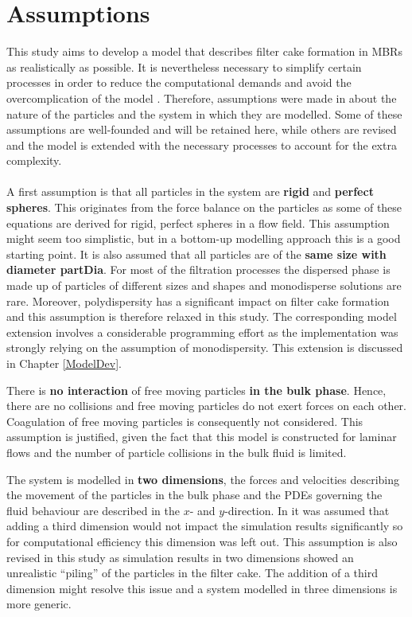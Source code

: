 \section{Assumptions \label{assumptions}}
This study aims to develop a model that describes filter cake formation in \gls{MBR}s as realistically as possible. It is nevertheless necessary to simplify certain processes in order to reduce the computational demands and avoid the overcomplication of the model \citep{bender2000}. Therefore, assumptions were made in \cite{Ghijs2014} about the nature of the particles and the system in which they are modelled. Some of these assumptions are well-founded and will be retained here, while others are revised and the model is extended with the necessary processes to account for the extra complexity. \\ \\
A first assumption is that all particles in the system are \textbf{rigid} and \textbf{perfect spheres}. This originates from the force balance on the particles as some of these equations are derived for rigid, perfect spheres in a flow field. This assumption might seem too simplistic, but in a bottom-up modelling approach this is a good starting point. It is also assumed that all particles are of the \textbf{same size with diameter \gls{partDia}}. For most of the filtration processes the dispersed phase is made up of particles of different sizes and shapes and monodisperse solutions are rare. Moreover, polydispersity has a significant impact on filter cake formation and this assumption is therefore relaxed in this study. The corresponding model extension involves a considerable programming effort as the implementation was strongly relying on the assumption of monodispersity. This extension is discussed in Chapter \ref{ModelDev}. %
\par
There is \textbf{no interaction} of free moving particles \textbf{in the bulk phase}. Hence, there are no collisions and free moving particles do not exert forces on each other. Coagulation of free moving particles is consequently not considered. This assumption is justified, given the fact that this model is constructed for laminar flows and the number of particle collisions in the bulk fluid is limited.\par
The system is modelled in \textbf{two dimensions}, the forces and velocities describing the movement of the particles in the bulk phase and the \glspl{PDE} governing the fluid behaviour are described in the $x$- and $y$-direction. In \cite{Ghijs2014} it was assumed that adding a third dimension would not impact the simulation results significantly so for computational efficiency this dimension was left out. This assumption is also revised in this study as simulation results in two dimensions showed an unrealistic ``piling'' of the particles in the filter cake. The addition of a third dimension might resolve this issue and a system modelled in three dimensions is more generic. \par
